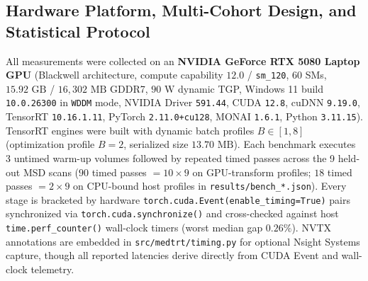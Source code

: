 \documentclass[10pt,twocolumn]{article}
\begin{document}
\subsection{Hardware Platform, Multi-Cohort Design, and Statistical Protocol}
All measurements were collected on an \textbf{NVIDIA GeForce RTX 5080 Laptop GPU} (Blackwell architecture, compute capability $12.0$ / \texttt{sm\_120}, $60$ SMs, $15.92\text{ GB}$ / $16,302\text{ MB}$ GDDR7, $90\text{ W}$ dynamic TGP, Windows 11 build \texttt{10.0.26300} in \texttt{WDDM} mode, NVIDIA Driver \texttt{591.44}, CUDA \texttt{12.8}, cuDNN \texttt{9.19.0}, TensorRT \texttt{10.16.1.11}, PyTorch \texttt{2.11.0+cu128}, MONAI \texttt{1.6.1}, Python \texttt{3.11.15}). TensorRT engines were built with dynamic batch profiles $B \in [1, 8]$ (optimization profile $B=2$, serialized size $13.70\text{ MB}$). Each benchmark executes 3 untimed warm-up volumes followed by repeated timed passes across the 9 held-out MSD scans ($90$ timed passes $= 10 \times 9$ on GPU-transform profiles; $18$ timed passes $= 2 \times 9$ on CPU-bound host profiles in \texttt{results/bench\_*.json}). Every stage is bracketed by hardware \texttt{torch.cuda.Event(enable\_timing=True)} pairs synchronized via \texttt{torch.cuda.synchronize()} and cross-checked against host \texttt{time.perf\_counter()} wall-clock timers (worst median gap $0.26\%$). NVTX annotations are embedded in \texttt{src/medtrt/timing.py} for optional Nsight Systems capture, though all reported latencies derive directly from CUDA Event and wall-clock telemetry.
\end{document}
